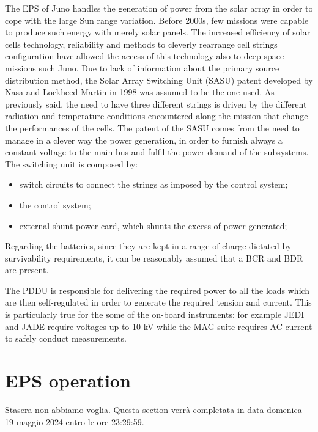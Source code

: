 The EPS of Juno handles the generation of power from the solar array  in order to cope with the large Sun range variation. Before 2000s, few missions were capable to produce such energy with merely solar panels. The increased efficiency of solar cells technology, reliability and methods to cleverly rearrange cell strings configuration have allowed the access of this technology also to deep space missions such Juno. 
Due to lack of information about the primary source distribution method, the Solar Array Switching Unit (SASU) patent developed by Nasa and Lockheed Martin in 1998 was assumed to be the one used. \mref 
As previously said, the need to have three different strings is driven by the different radiation and temperature conditions encountered along the mission that change the performances of the cells. The patent of the SASU comes from the need to manage in a clever way the power generation, in order to furnish always a constant voltage to the main bus and fulfil the power demand of the subsystems. The switching unit is composed by:
\begin{itemize}
    \item switch circuits to connect the strings as imposed by the control system;
    \item the control system;
    \item external shunt power card, which shunts the excess of power generated;
\end{itemize}

Regarding the batteries, since they are kept in a range of charge dictated by survivability requirements, it can be reasonably assumed that a BCR and BDR are present. 

The PDDU is responsible for delivering the required power to all the loads which are then self-regulated in order to generate the required tension and current. This is particularly true for the some of the on-board instruments: for example JEDI\cite{JEDI_info} and JADE\cite{JADE_info} require voltages up to 10 kV while the MAG\cite{MAG_info} suite requires AC current to safely conduct measurements.

\section{EPS operation}
\label{sec:eps_ops}

Stasera non abbiamo voglia. Questa section verrà completata in data domenica 19 maggio 2024 entro le ore 23:29:59. 